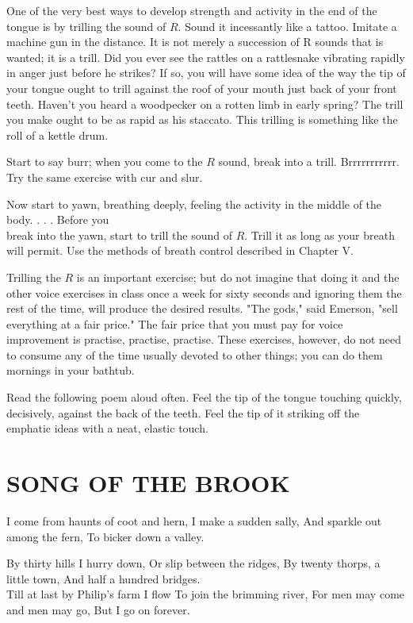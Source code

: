 \documentclass[10pt]{article}
\begin{document}
One of the very best ways to develop strength and activity in the end of the tongue is by trilling the sound of $R$. Sound it incessantly like a tattoo. Imitate a machine gun in the distance. It is not merely a succession of R sounds that is wanted; it is a trill. Did you ever see the rattles on a rattlesnake vibrating rapidly in anger just before he strikes? If so, you will have some idea of the way the tip of your tongue ought to trill against the roof of your mouth just back of your front teeth. Haven't you heard a woodpecker on a rotten limb in early spring? The trill you make ought to be as rapid as his staccato. This trilling is something like the roll of a kettle drum.

Start to say burr; when you come to the $R$ sound, break into a trill. Brrrrrrrrrrr. Try the same exercise with cur and slur.

Now start to yawn, breathing deeply, feeling the activity in the middle of the body. . . . Before you\\
break into the yawn, start to trill the sound of $R$. Trill it as long as your breath will permit. Use the methods of breath control described in Chapter V.

Trilling the $R$ is an important exercise; but do not imagine that doing it and the other voice exercises in class once a week for sixty seconds and ignoring them the rest of the time, will produce the desired results. "The gods," said Emerson, "sell everything at a fair price." The fair price that you must pay for voice improvement is practise, practise, practise. These exercises, however, do not need to consume any of the time usually devoted to other things; you can do them mornings in your bathtub.

Read the following poem aloud often. Feel the tip of the tongue touching quickly, decisively, against the back of the teeth. Feel the tip of it striking off the emphatic ideas with a neat, elastic touch.

\section*{SONG OF THE BROOK}
I come from haunts of coot and hern, I make a sudden sally, And sparkle out among the fern, To bicker down a valley.

By thirty hills I hurry down, Or slip between the ridges, By twenty thorps, a little town, And half a hundred bridges.\\
Till at last by Philip's farm I flow To join the brimming river, For men may come and men may go, But I go on forever.
\end{document}
